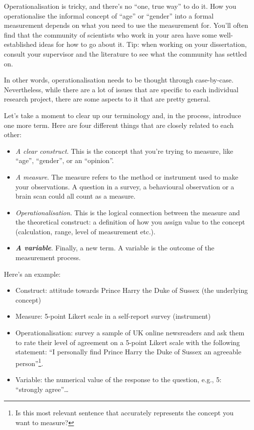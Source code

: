 \documentclass[
  11pt,
  a4paper,
  twoside,symmetric,openright]{book}
\providecommand{\tightlist}{%
  \setlength{\itemsep}{0pt}\setlength{\parskip}{0pt}}
\theoremstyle{break}
\theoremstyle{break}
\begin{document}
Operationalisation is tricky, and there's no ``one, true way'' to do it. How you operationalise the informal concept of ``age'' or ``gender'' into a formal measurement depends on what you need to use the measurement for. You'll often find that the community of scientists who work in your area have some well-established ideas for how to go about it. Tip: when working on your dissertation, consult your supervisor and the literature to see what the community has settled on.

In other words, operationalisation needs to be thought through case-by-case. Nevertheless, while there are a lot of issues that are specific to each individual research project, there are some aspects to it that are pretty general.

Let's take a moment to clear up our terminology and, in the process, introduce one more term. Here are four different things that are closely related to each other:

\begin{itemize}
\tightlist
\item
  \emph{A clear construct}. This is the concept that you're trying to measure, like ``age'', ``gender'', or an ``opinion''.
\item
  \emph{A measure}. The measure refers to the method or instrument used to make your observations. A question in a survey, a behavioural observation or a brain scan could all count as a measure.
\item
  \emph{Operationalisation}. This is the logical connection between the measure and the theoretical construct: a definition of how you assign value to the concept (calculation, range, level of measurement etc.).
\item
  \textbf{\emph{A variable}}. Finally, a new term. A variable is the outcome of the measurement process.
\end{itemize}

\begin{example}[Method]
\protect\hypertarget{exm:exops}{}\label{exm:exops}

Here's an example:

\begin{itemize}
\tightlist
\item
  Construct: attitude towards Prince Harry the Duke of Sussex (the underlying concept)
\item
  Measure: 5-point Likert scale in a self-report survey (instrument)
\item
  Operationalisation: survey a sample of UK online newsreaders and ask them to rate their level of agreement on a 5-point Likert scale with the following statement: ``I personally find Prince Harry the Duke of Sussex an agreeable person''\footnote{Is this most relevant sentence that accurately represents the concept you want to measure?}.
\item
  Variable: the numerical value of the response to the question, e.g., 5: ``strongly agree''\ldots{}
\end{itemize}

\end{example}
\end{document}
